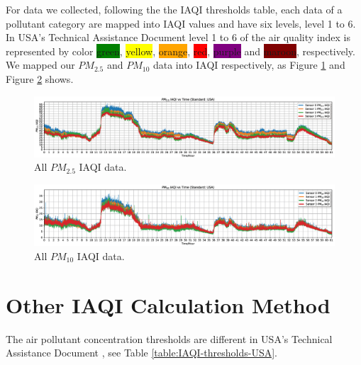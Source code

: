 For data we collected, following the the IAQI thresholds table, each data of a pollutant category are mapped into IAQI values and have six levels, level 1 to 6. In USA's Technical Assistance Document \cite{daq2018} level 1 to 6 of the air quality index is represented by color \colorbox{green}{green}, \colorbox{yellow}{yellow}, \colorbox{orange}{orange}, \colorbox{red}{red}, \colorbox{purple}{purple} and \colorbox{maroon}{maroon}, respectively. We mapped our $PM_{2.5}$ and $PM_{10}$ data into IAQI respectively, as Figure \ref{fig/pm25_all_iaqi} and Figure \ref{fig/pm10_all_iaqi} shows.

\begin{figure}[!htbp]
    \begin{center}
    \includegraphics[width=\linewidth]{fig/iaqi/pm25_all_iaqi.png}
    \end{center}
    \caption{All $PM_{2.5}$ IAQI data.}
    \label{fig/pm25_all_iaqi}
\end{figure}

\begin{figure}[!htbp]
    \begin{center}
    \includegraphics[width=\linewidth]{fig/iaqi/pm10_all_iaqi.png}
    \end{center}
    \caption{All $PM_{10}$ IAQI data.}
    \label{fig/pm10_all_iaqi}
\end{figure}

\section{Other IAQI Calculation Method}
The air pollutant concentration thresholds are different in USA's Technical Assistance Document \cite{daq2018}, see Table \ref{table:IAQI-thresholds-USA}.

